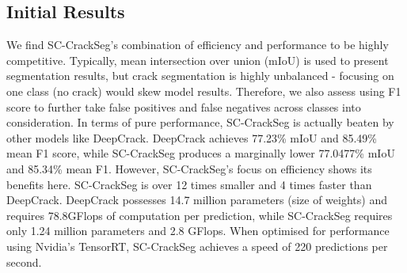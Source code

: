 \documentclass[a4paper,12pt]{report}
\begin{document}
\subsection{Initial Results}
We find SC-CrackSeg's combination of efficiency and performance to be highly competitive. Typically, mean intersection over union (mIoU) is used to present segmentation results, but crack segmentation is highly unbalanced - focusing on one class (no crack) would skew model results. Therefore, we also assess using F1 score to further take false positives and false negatives across classes into consideration. In terms of pure performance, SC-CrackSeg is actually beaten by other models like DeepCrack. DeepCrack achieves 77.23\% mIoU and 85.49\% mean F1 score, while SC-CrackSeg produces a marginally lower 77.0477\% mIoU and 85.34\% mean F1. However, SC-CrackSeg's focus on efficiency shows its benefits here. SC-CrackSeg is over 12 times smaller and 4 times faster than DeepCrack. DeepCrack possesses 14.7 million parameters (size of weights) and requires 78.8GFlops of computation per prediction, while SC-CrackSeg requires only 1.24 million parameters and 2.8 GFlops. When optimised for performance using Nvidia's TensorRT, SC-CrackSeg achieves a speed of 220 predictions per second.
\end{document}
